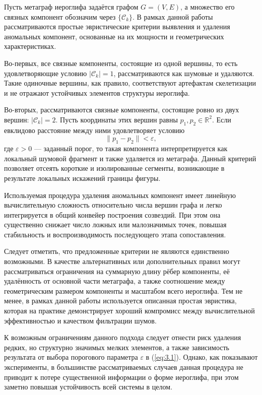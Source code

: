 Пусть метаграф иероглифа задаётся графом
\(G = (V, E)\),
а множество его связных компонент обозначим через
\(\{\mathcal{C}_k\}\).
В рамках данной работы рассматриваются простые эвристические критерии
выявления и удаления аномальных компонент,
основанные на их мощности и геометрических характеристиках.

Во-первых, все связные компоненты, состоящие из одной вершины,
то есть удовлетворяющие условию
\(|\mathcal{C}_k| = 1\),
рассматриваются как шумовые и удаляются.
Такие одиночные вершины, как правило,
соответствуют артефактам скелетизации
и не отражают устойчивых элементов структуры иероглифа.

Во-вторых, рассматриваются связные компоненты,
состоящие ровно из двух вершин:
\(|\mathcal{C}_k| = 2\).
Пусть координаты этих вершин равны
\(p_1, p_2 \in \mathbb{R}^2\).
Если евклидово расстояние между ними удовлетворяет условию
\begin{equation}
    \|p_1 - p_2\| < \varepsilon,
    \label{eq:3.1}
\end{equation}
где \(\varepsilon > 0\) — заданный порог,
то такая компонента интерпретируется
как локальный шумовой фрагмент и также удаляется из метаграфа.
Данный критерий позволяет отсеять короткие и изолированные сегменты,
возникающие в результате локальных искажений границы фигуры.

Используемая процедура удаления аномальных компонент
имеет линейную вычислительную сложность
относительно числа вершин графа
и легко интегрируется в общий конвейер построения созвездий.
При этом она существенно снижает число ложных или
малозначимых точек,
повышая стабильность и воспроизводимость
последующего этапа сопоставления.

Следует отметить, что предложенные критерии
не являются единственно возможными.
В качестве альтернативных или дополнительных правил
могут рассматриваться ограничения
на суммарную длину рёбер компоненты,
её удалённость от основной части метаграфа,
а также соотношение между геометрическим размером компоненты
и масштабом всего иероглифа.
Тем не менее, в рамках данной работы
используется описанная простая эвристика,
которая на практике демонстрирует
хороший компромисс между вычислительной эффективностью
и качеством фильтрации шумов.

К возможным ограничениям данного подхода
следует отнести риск удаления редких,
но структурно значимых мелких элементов,
а также зависимость результата от выбора порогового параметра \(\varepsilon\) в (\ref{eq:3.1}).
Однако, как показывают эксперименты,
в большинстве рассматриваемых случаев
данная процедура не приводит к потере
существенной информации о форме иероглифа,
при этом заметно повышая устойчивость
всей системы в целом.


